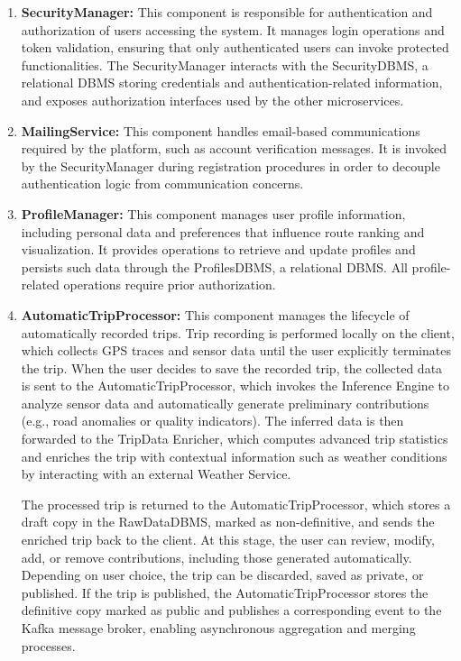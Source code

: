 \begin{enumerate}

    \item \textbf{SecurityManager:}  
    This component is responsible for authentication and authorization of users accessing the system. It manages login operations and token validation, ensuring that only authenticated users can invoke protected functionalities. The SecurityManager interacts with the SecurityDBMS, a relational DBMS storing credentials and authentication-related information, and exposes authorization interfaces used by the other microservices.

    \item \textbf{MailingService:}  
    This component handles email-based communications required by the platform, such as account verification messages. It is invoked by the SecurityManager during registration procedures in order to decouple authentication logic from communication concerns.

    \item \textbf{ProfileManager:}  
    This component manages user profile information, including personal data and preferences that influence route ranking and visualization. It provides operations to retrieve and update profiles and persists such data through the ProfilesDBMS, a relational DBMS. All profile-related operations require prior authorization.

    \item \textbf{AutomaticTripProcessor:}  
    This component manages the lifecycle of automatically recorded trips. Trip recording is performed locally on the client, which collects GPS traces and sensor data until the user explicitly terminates the trip. When the user decides to save the recorded trip, the collected data is sent to the AutomaticTripProcessor, which invokes the Inference Engine to analyze sensor data and automatically generate preliminary contributions (e.g., road anomalies or quality indicators). The inferred data is then forwarded to the TripData Enricher, which computes advanced trip statistics and enriches the trip with contextual information such as weather conditions by interacting with an external Weather Service.
    
    The processed trip is returned to the AutomaticTripProcessor, which stores a draft copy in the RawDataDBMS, marked as non-definitive, and sends the enriched trip back to the client. At this stage, the user can review, modify, add, or remove contributions, including those generated automatically. Depending on user choice, the trip can be discarded, saved as private, or published. If the trip is published, the AutomaticTripProcessor stores the definitive copy marked as public and publishes a corresponding event to the Kafka message broker, enabling asynchronous aggregation and merging processes.
    

\end{enumerate}
